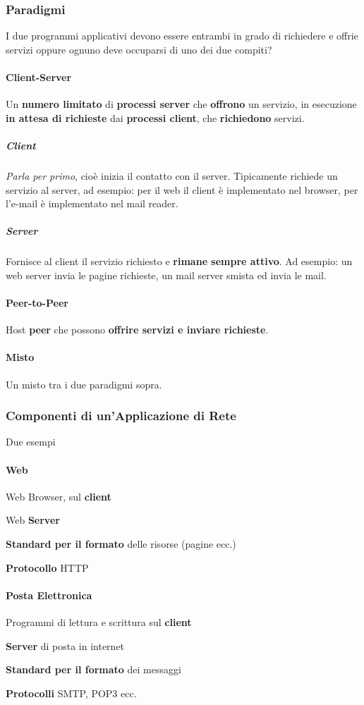 \documentclass[10pt]{article}
\begin{document}
\subsubsection{Paradigmi}
I due programmi applicativi devono essere entrambi in grado di richiedere e offrie servizi oppure ognuno deve occuparsi di uno dei due compiti?
\paragraph{Client-Server} Un \textbf{numero limitato} di \textbf{processi server} che \textbf{offrono} un servizio, in esecuzione \textbf{in attesa di richieste} dai \textbf{processi client}, che \textbf{richiedono} servizi.
\subparagraph{Client} \textit{Parla per primo}, cioè inizia il contatto con il server. Tipicamente richiede un servizio al server, ad esempio: per il web il client è implementato nel browser, per l'e-mail è implementato nel mail reader.
\subparagraph{Server} Fornisce al client il servizio richiesto e \textbf{rimane sempre attivo}. Ad esempio: un web server invia le pagine richieste, un mail server smista ed invia le mail.
\paragraph{Peer-to-Peer} Host \textbf{peer} che possono \textbf{offrire servizi e inviare richieste}.
\paragraph{Misto} Un misto tra i due paradigmi sopra.
\subsubsection{Componenti di un'Applicazione di Rete}
Due esempi
\paragraph{Web}
\begin{list}{-}{Composto da:}
\item Web Browser, sul \textbf{client}
\item Web \textbf{Server}
\item \textbf{Standard per il formato} delle risorse (pagine ecc.)
\item \textbf{Protocollo} HTTP
\end{list}
\paragraph{Posta Elettronica}
\begin{list}{-}{Composta da:}
\item Programmi di lettura e scrittura sul \textbf{client}
\item \textbf{Server} di posta in internet
\item \textbf{Standard per il formato} dei messaggi
\item \textbf{Protocolli} SMTP, POP3 ecc.
\end{list}
\end{document}
